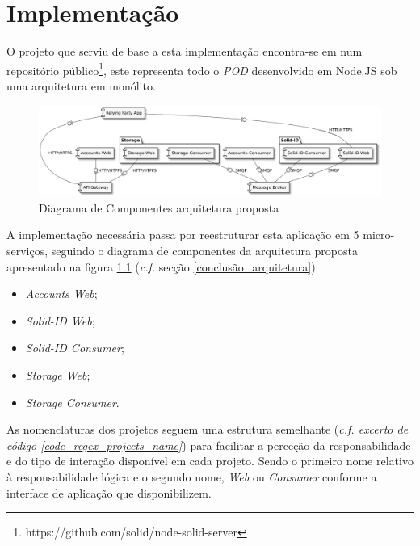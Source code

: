 
\chapter{Implementação}
\label{cap:5}

O projeto que serviu de base a esta implementação encontra-se em num repositório público\footnote{https://github.com/solid/node-solid-server}, este representa todo o \emph{\acrshort{POD}} desenvolvido em Node.JS sob uma arquitetura em monólito.

\begin{figure}[h]
    \begin{center}
    \includegraphics[width=1 \textwidth]{figures/arquitetura_2_diagrama_componentes.eps}
    \caption{Diagrama de Componentes arquitetura proposta}
    \label{implementacao_arquitetura_2_diagrama_componentes}
    \end{center}
\end{figure}

A implementação necessária passa por reestruturar esta aplicação em 5 micro-serviços, seguindo o diagrama de componentes da arquitetura proposta apresentado na figura \ref{implementacao_arquitetura_2_diagrama_componentes}  (\emph{c.f.} secção \ref{conclusão_arquitetura}):
\begin{itemize}
    \item \emph{Accounts Web};
    \item \emph{Solid-ID Web};
    \item \emph{Solid-ID Consumer};
    \item \emph{Storage Web};
    \item \emph{Storage Consumer}.
\end{itemize}

As nomenclaturas dos projetos seguem uma estrutura semelhante (\emph{c.f. excerto de código \ref{code_regex_projects_name}}) para facilitar a perceção da responsabilidade e do tipo de interação disponível em cada projeto. Sendo o primeiro nome relativo à responsabilidade lógica e o segundo nome, \emph{Web} ou \emph{Consumer} conforme a interface de aplicação que disponibilizem.

